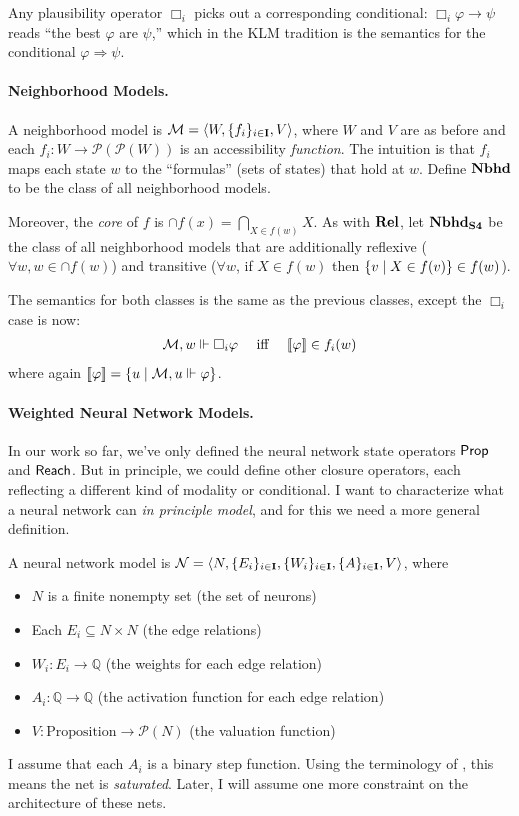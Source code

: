 \documentclass[letterpaper]{article}
\begin{document}
Any plausibility operator $\Box_i$ picks out a corresponding conditional: $\Box_i \varphi \to \psi$ reads ``the best $\varphi$ are $\psi$,'' which in the KLM tradition is the semantics for the conditional $\varphi \Rightarrow \psi$.

\paragraph*{Neighborhood Models.} A neighborhood model is $\mathcal{M} = \langle W, \{ f_i \}_{i \in \textbf{I}}, V \rangle$, where $W$ and $V$ are as before and each $f_i : W \to \mathcal{P}(\mathcal{P}(W))$ is an accessibility \emph{function}.  The intuition is that $f_i$ maps each state $w$ to the ``formulas'' (sets of states) that hold at $w$.  Define $\textrm{\textbf{Nbhd}}$ to be the class of all neighborhood models.  

Moreover, the \emph{core} of $f$ is $\cap f(x) = \bigcap_{X \in f(w)} X$.  As with $\textrm{\textbf{Rel}}$, let $\textrm{\textbf{Nbhd}}_\textrm{\textbf{S4}}$ be the class of all neighborhood models that are additionally reflexive ($\forall w, w \in \cap f(w)$) and transitive ($\forall w$, if $X \in f(w)$ then $\{ v \mid X \in f(v) \} \in f(w)$).

The semantics for both classes is the same as the previous classes, except the $\Box_i$ case is now:
\[
\begin{array}{lcl}
    \mathcal{M}, w \Vdash \Box_i \varphi & \mbox{ iff } & [\![\mbox{\em $ \varphi $\/}]\!] \in f_i(w)
\end{array}
\]
where again $[\![\mbox{\em $ \varphi $\/}]\!] = \{ u \mid \mathcal{M}, u \Vdash \varphi \}$.

\paragraph*{Weighted Neural Network Models.} 
In our work \cite{kisby2024hebbian} so far, we've only defined the neural network state operators $\mathsf{Prop}$ and $\mathsf{Reach}$.  But in principle, we could define other closure operators, each reflecting a different kind of modality or conditional.  I want to characterize what a neural network  can \emph{in principle model}, and for this we need a more general definition.

A neural network model is $\mathcal{N} = \langle N, \{ E_i \}_{i \in \textbf{I}}, \{ W_i \}_{i \in \textbf{I}}, \{ A \}_{i \in \textbf{I}}, V \rangle$, where
\begin{itemize}
    \item $N$ is a finite nonempty set (the set of neurons)
    \item Each $E_i \subseteq N \times N$ (the edge relations)
    \item $W_i : E_i \to \mathbb{Q}$ (the weights for each edge relation)
    \item $A_i : \mathbb{Q} \to \mathbb{Q}$ (the activation function for each edge relation)
    \item $V : \textrm{Proposition} \to \mathcal{P}(N)$ (the valuation function)
\end{itemize}
I assume that each $A_i$ is a binary step function.  Using the terminology of \cite{merrill2020formal}, this means the net is \emph{saturated}.  Later, I will assume one more constraint on the architecture of these nets.
\end{document}
